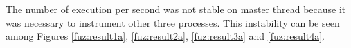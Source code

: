 The number of execution per second was not stable on master thread because it
was necessary to instrument other three processes. This instability can be
seen among Figures \ref{fuz:result1a}, \ref{fuz:result2a}, \ref{fuz:result3a}
and \ref{fuz:result4a}.


%
%
%
%
%
%
%
%
%
%
